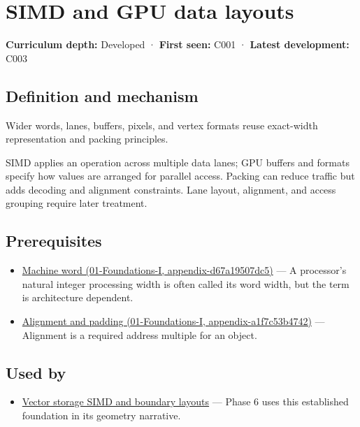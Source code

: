 \hypertarget{appendix-3c7b1a56de01}{}
\section{SIMD and GPU data layouts}\label{appendix-3c7b1a56de01-simd-and-gpu-data-layouts}

\textbf{Curriculum depth:} Developed · \textbf{First seen:} C001 · \textbf{Latest development:} C003

\subsection{Definition and mechanism}\label{appendix-3c7b1a56de01-definition-and-mechanism}

Wider words, lanes, buffers, pixels, and vertex formats reuse exact-width representation and packing principles.

SIMD applies an operation across multiple data lanes; GPU buffers and formats specify how values are arranged for parallel access. Packing can reduce traffic but adds decoding and alignment constraints. Lane layout, alignment, and access grouping require later treatment.

\subsection{Prerequisites}\label{appendix-3c7b1a56de01-prerequisites}

\begin{itemize}
\tightlist
\item
  \href{../01-Foundations-I/main.pdf\#nameddest=appendix-d67a19507dc5}{Machine word (01-Foundations-I, appendix-d67a19507dc5)} --- A processor's natural integer processing width is often called its word width, but the term is architecture dependent.
\item
  \href{../01-Foundations-I/main.pdf\#nameddest=appendix-a1f7c53b4742}{Alignment and padding (01-Foundations-I, appendix-a1f7c53b4742)} --- Alignment is a required address multiple for an object.
\end{itemize}

\subsection{Used by}\label{appendix-3c7b1a56de01-used-by}

\begin{itemize}
\tightlist
\item
  \hyperref[appendix-26bf6bf2fb8b]{Vector storage SIMD and boundary layouts} --- Phase 6 uses this established foundation in its geometry narrative.
\end{itemize}

